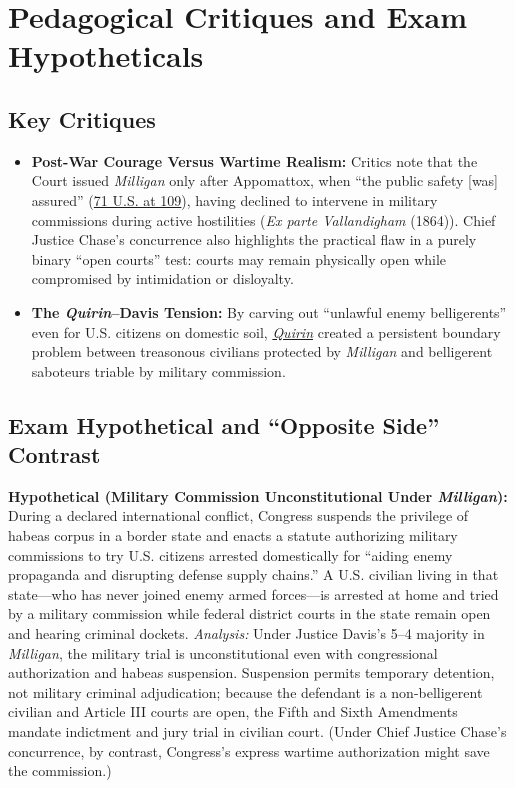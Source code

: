\documentclass[12pt]{article}
\begin{document}
\section{Pedagogical Critiques and Exam Hypotheticals}

\subsection*{Key Critiques}

\begin{itemize}
  \item \textbf{Post-War Courage Versus Wartime Realism:} Critics note that the Court issued \textit{Milligan} only after Appomattox, when ``the public safety [was] assured'' (\href{https://supreme.justia.com/cases/federal/us/71/2/}{71 U.S. at 109}), having declined to intervene in military commissions during active hostilities (\textit{Ex parte Vallandigham} (1864)). Chief Justice Chase's concurrence also highlights the practical flaw in a purely binary ``open courts'' test: courts may remain physically open while compromised by intimidation or disloyalty.
  \item \textbf{The \textit{Quirin}--Davis Tension:} By carving out ``unlawful enemy belligerents'' even for U.S. citizens on domestic soil, \href{https://supreme.justia.com/cases/federal/us/317/1/}{\textit{Quirin}} created a persistent boundary problem between treasonous civilians protected by \textit{Milligan} and belligerent saboteurs triable by military commission.
\end{itemize}

\subsection*{Exam Hypothetical and ``Opposite Side'' Contrast}

\textbf{Hypothetical (Military Commission Unconstitutional Under \textit{Milligan}):} During a declared international conflict, Congress suspends the privilege of habeas corpus in a border state and enacts a statute authorizing military commissions to try U.S. citizens arrested domestically for ``aiding enemy propaganda and disrupting defense supply chains.'' A U.S. civilian living in that state---who has never joined enemy armed forces---is arrested at home and tried by a military commission while federal district courts in the state remain open and hearing criminal dockets. \textit{Analysis:} Under Justice Davis's 5--4 majority in \textit{Milligan}, the military trial is unconstitutional even with congressional authorization and habeas suspension. Suspension permits temporary detention, not military criminal adjudication; because the defendant is a non-belligerent civilian and Article III courts are open, the Fifth and Sixth Amendments mandate indictment and jury trial in civilian court. (Under Chief Justice Chase's concurrence, by contrast, Congress's express wartime authorization might save the commission.)
\end{document}
